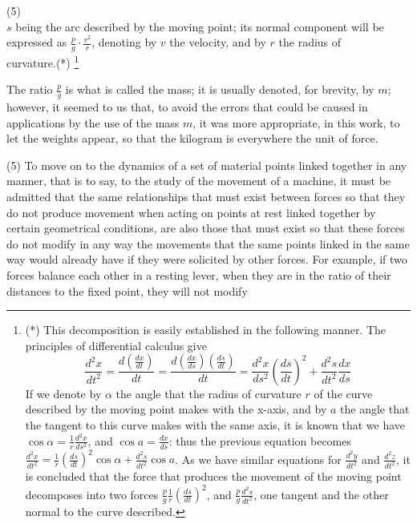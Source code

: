 \documentclass{book}
\begin{document}
\newpage

(5)
\\
\( s \) being the arc described by the moving point; its normal component will be expressed as \( \frac{p}{g} \cdot \frac{v^2}{r} \), denoting by \( v \) the velocity, and by \( r \) the radius of\\ curvature.(*) \footnote{(*) This decomposition is easily established in the following manner. The principles of differential calculus give
\[
\frac{d^2x}{dt^2} = \frac{d \left( \frac{dx}{dt} \right)}{dt} = \frac{d \left( \frac{dx}{ds} \right) \left( \frac{ds}{dt} \right)}{dt} = \frac{d^2x}{ds^2} \left( \frac{ds}{dt} \right)^2 + \frac{d^2s}{dt^2} \frac{dx}{ds}
\]
If we denote by \( \alpha \) the angle that the radius of curvature \( r \) of the curve described by the moving point makes with the x-axis, and by \( a \) the angle that the tangent to this curve makes with the same axis, it is known that we have \( \cos \alpha = \frac{1}{r} \frac{d^2x}{ds^2} \), and \( \cos a = \frac{dx}{ds} \): thus the previous equation becomes \( \frac{d^2x}{dt^2} = \frac{1}{r} \left( \frac{ds}{dt} \right)^2 \cos \alpha + \frac{d^2s}{dt^2} \cos a \). As we have similar equations for \( \frac{d^2y}{dt^2} \) and \( \frac{d^2z}{dt^2} \), it is concluded that the force that produces the movement of the moving point decomposes into two forces \( \frac{p}{g} \frac{1}{r} \left( \frac{ds}{dt} \right)^2 \), and \( \frac{p}{g} \frac{d^2s}{dt^2} \), one tangent and the other normal to the curve described.}

The ratio \( \frac{p}{g} \) is what is called the mass; it is usually denoted, for brevity, by \( m \); however, it seemed to us that, to avoid the errors that could be caused in applications by the use of the mass \( m \), it was more appropriate, in this work, to let the weights appear, so that the kilogram is everywhere the unit of force.

(5) To move on to the dynamics of a set of material points linked together in any manner, that is to say, to the study of the movement of a machine, it must be admitted that the same relationships that must exist between forces so that they do not produce movement when acting on points at rest linked together by certain geometrical conditions, are also those that must exist so that these forces do not modify in any way the movements that the same points linked in the same way would already have if they were solicited by other forces. For example, if two forces balance each other in a resting lever, when they are in the ratio of their distances to the fixed point, they will not modify 
\end{document}
